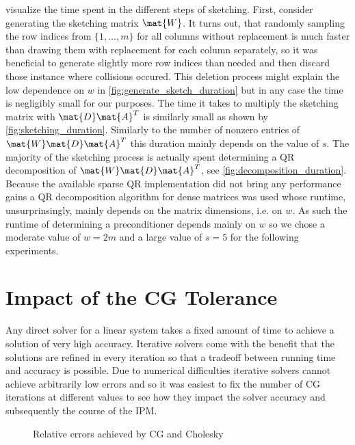  visualize the time spent in the different steps of sketching.
First, consider generating the sketching matrix \(\mat{W}\).
It turns out, that randomly sampling the row indices from \(\{1, \ldots, m\}\) for all columns without replacement is much faster than drawing them with replacement for each column separately, so it was beneficial to generate slightly more row indices than needed and then discard those instance where collisions occured.
This deletion process might explain the low dependence on \(w\) in \cref{fig:generate_sketch_duration} but in any case the time is negligibly small for our purposes.
The time it takes to multiply the sketching matrix with \(\mat{D}\mat{A}^T\) is similarly small as shown by \cref{fig:sketching_duration}.
Similarly to the number of nonzero entries of \(\mat{W}\mat{D}\mat{A}^T\) this duration mainly depends on the value of \(s\).
The majority of the sketching process is actually spent determining a QR decomposition of \(\mat{W}\mat{D}\mat{A}^T\), see \cref{fig:decomposition_duration}.
Because the available sparse QR implementation did not bring any performance gains a QR decomposition algorithm for dense matrices was used whose runtime, unsurprinsingly, mainly depends on the matrix dimensions, i.e. on \(w\).
As such the runtime of determining a preconditioner depends mainly on \(w\) so we chose a moderate value of \(w=2m\) and a large value of \(s=5\) for the following experiments.

\section{Impact of the CG Tolerance}

Any direct solver for a linear system takes a fixed amount of time to achieve a solution of very high accuracy.
Iterative solvers come with the benefit that the solutions are refined in every iteration so that a tradeoff between running time and accuracy is possible.
Due to numerical difficulties iterative solvers cannot achieve arbitrarily low errors and so it was easiest to fix the number of CG iterations at different values to see how they impact the solver accuracy and subsequently the course of the IPM.

\begin{figure}[tbp]
  \centering%
  \caption{Relative errors achieved by CG and Cholesky}%
  \label{fig:residual_norms}
\end{figure}

